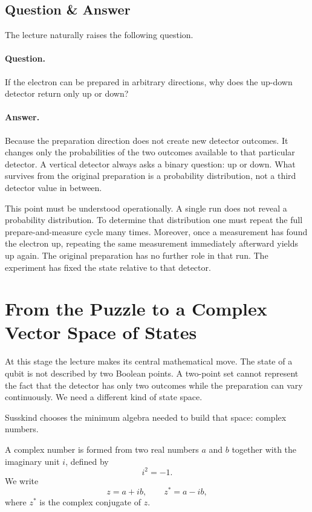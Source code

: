 \subsection{Question \& Answer}

The lecture naturally raises the following question.

\paragraph{Question.} If the electron can be prepared in arbitrary directions, why does the up-down detector return only up or down?

\paragraph{Answer.} Because the preparation direction does not create new detector outcomes. It changes only the probabilities of the two outcomes available to that particular detector. A vertical detector always asks a binary question: up or down. What survives from the original preparation is a probability distribution, not a third detector value in between.

This point must be understood operationally. A single run does not reveal a probability distribution. To determine that distribution one must repeat the full prepare-and-measure cycle many times. Moreover, once a measurement has found the electron up, repeating the same measurement immediately afterward yields up again. The original preparation has no further role in that run. The experiment has fixed the state relative to that detector.

\section{From the Puzzle to a Complex Vector Space of States}

At this stage the lecture makes its central mathematical move. The state of a qubit is not described by two Boolean points. A two-point set cannot represent the fact that the detector has only two outcomes while the preparation can vary continuously. We need a different kind of state space.

Susskind chooses the minimum algebra needed to build that space: complex numbers.

A complex number is formed from two real numbers \(a\) and \(b\) together with the imaginary unit \(i\), defined by
\begin{equation}
i^2=-1.
\end{equation}
We write
\begin{equation}
z=a+ib,
\qquad
z^*=a-ib,
\end{equation}
where \(z^*\) is the complex conjugate of \(z\).

